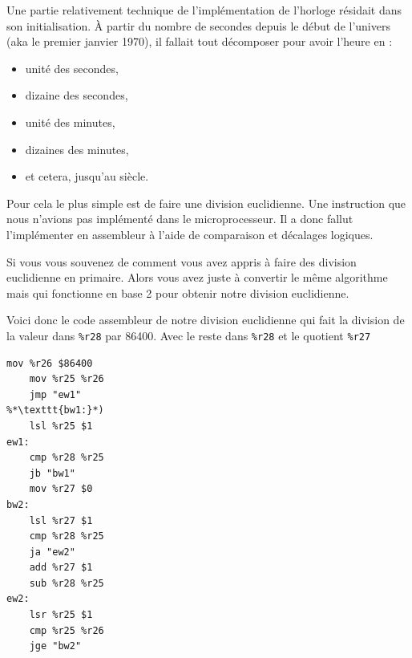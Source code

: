 \documentclass[10pt,a4paper,notitlepage ]{article}
\begin{document}
			Une partie relativement technique de l'implémentation de l'horloge résidait dans son initialisation. À partir du nombre de secondes depuis le début de l'univers (aka le premier janvier 1970), il fallait tout décomposer pour avoir l'heure en :
			\begin{itemize}
				\item unité des secondes,
				\item dizaine des secondes,
				\item unité des minutes,
				\item dizaines des minutes,
				\item et cetera, jusqu'au siècle.
			\end{itemize}

			Pour cela le plus simple est de faire une division euclidienne. Une instruction que nous n'avions pas implémenté dans le microprocesseur. Il a donc fallut l'implémenter en assembleur à l'aide de comparaison et décalages logiques.

			Si vous vous souvenez de comment vous avez appris à faire des division euclidienne en primaire. Alors vous avez juste à convertir le même algorithme mais qui fonctionne en base 2 pour obtenir notre division euclidienne.

			Voici donc le code assembleur de notre division euclidienne qui fait la division de la valeur dans \texttt{\%r28} par 86400. Avec le reste dans \texttt{\%r28} et le quotient \texttt{\%r27}

\begin{lstlisting}[language={[x86masm]Assembler},morekeywords={lsr}]
	mov %r26 $86400
	mov %r25 %r26
	jmp "ew1"
%*\texttt{bw1:}*)
	lsl %r25 $1
ew1:
	cmp %r28 %r25
	jb "bw1"
	mov %r27 $0
bw2:
	lsl %r27 $1
	cmp %r28 %r25
	ja "ew2"
	add %r27 $1
	sub %r28 %r25
ew2:
	lsr %r25 $1
	cmp %r25 %r26
	jge "bw2"

\end{lstlisting}
\end{document}
